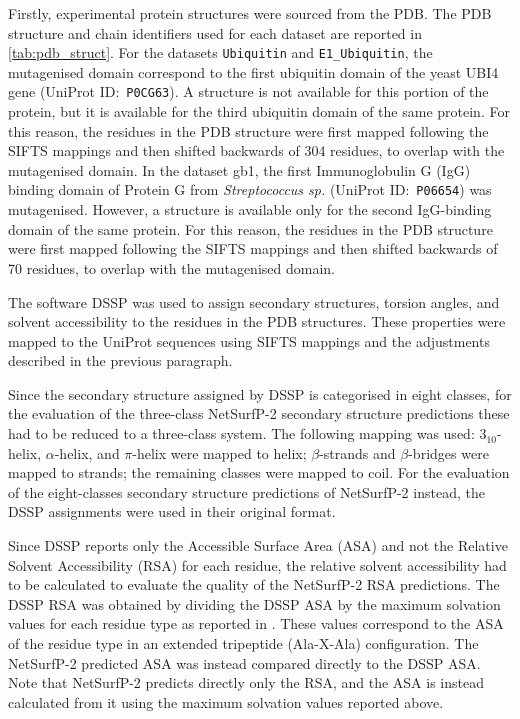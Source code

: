 Firstly, experimental protein structures were sourced from the PDB.\@
The PDB structure and chain identifiers used for each dataset are reported in \cref{tab:pdb_struct}.
For the datasets \texttt{Ubiquitin} and \texttt{E1\_Ubiquitin}, the mutagenised domain correspond to the first ubiquitin domain of the yeast UBI4 gene (UniProt ID:~\texttt{P0CG63}).
A structure is not available for this portion of the protein, but it is available for the third ubiquitin domain of the same protein.
For this reason, the residues in the PDB structure were first mapped following the SIFTS mappings and then shifted backwards of \num{304} residues, to overlap with the mutagenised domain.
In the dataset gb1, the first Immunoglobulin G (IgG) binding domain of Protein G from \textit{Streptococcus sp.} (UniProt ID:~\texttt{P06654}) was mutagenised.
However, a structure is available only for the second IgG-binding domain of the same protein.
For this reason, the residues in the PDB structure were first mapped following the SIFTS mappings and then shifted backwards of \num{70} residues, to overlap with the mutagenised domain.

The software DSSP was used to assign secondary structures, torsion angles, and solvent accessibility to the residues in the PDB structures.
These properties were mapped to the UniProt sequences using SIFTS mappings and the adjustments described in the previous paragraph.

Since the secondary structure assigned by DSSP is categorised in eight classes, for the evaluation of the three-class NetSurfP-2 secondary structure predictions these had to be reduced to a three-class system.
The following mapping was used: $3_{10}$-helix, $\alpha$-helix, and $\pi$-helix were mapped to helix; $\beta$-strands and $\beta$-bridges were mapped to strands; the remaining classes were mapped to coil.
For the evaluation of the eight-classes secondary structure predictions of NetSurfP-2 instead, the DSSP assignments were used in their original format.

Since DSSP reports only the Accessible Surface Area (ASA) and not the Relative Solvent Accessibility (RSA) for each residue, the relative solvent accessibility had to be calculated to evaluate the quality of the NetSurfP-2 RSA predictions.
The DSSP RSA was obtained by dividing the DSSP ASA by the maximum solvation values for each residue type as reported in \textcite{Ahmad2003}.
These values correspond to the ASA of the residue type in an extended tripeptide (Ala-X-Ala) configuration.
The NetSurfP-2 predicted ASA was instead compared directly to the DSSP ASA.\@
Note that NetSurfP-2 predicts directly only the RSA, and the ASA is instead calculated from it using the maximum solvation values reported above.

